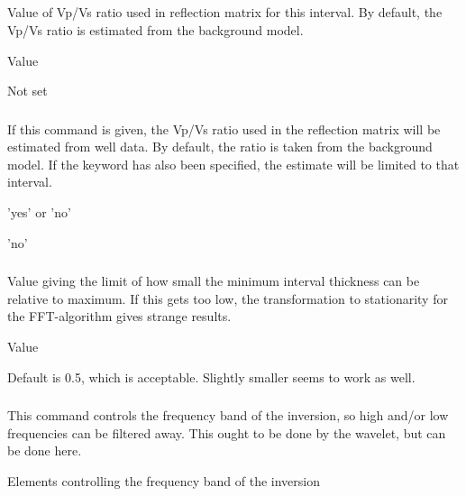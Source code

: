 \subparagraph{}
 \slist
   \item \Description Value of Vp/Vs ratio used in reflection
     matrix for this interval. By default, the Vp/Vs ratio is estimated from the
     background model.
   \item \Argument Value
   \item \Default Not set
   \elist
 
\subsubsection{}
 \slist
   \item \Description If this command is given, the Vp/Vs ratio used
     in the reflection matrix will be estimated from well data. By
     default, the ratio is taken from the background model. If the
     keyword  has also been specified,
     the estimate will be limited to that interval.
   \item \Argument 'yes' or 'no'
   \item \Default 'no'
   \elist

\subsubsection{}
 \slist
   \item \Description Value giving the limit of how small the minimum interval thickness can be relative to maximum. If this gets too low, the transformation to stationarity for the FFT-algorithm gives strange results.
   \item \Argument Value
   \item \Default Default is 0.5, which is acceptable. Slightly smaller seems to work as well.
 \elist

\subsubsection{}
 \slist
   \item \Description This command controls the frequency band of the inversion, so high and/or low frequencies can be filtered away. This ought to be done by the wavelet, but can be done here.
   \item \Argument Elements controlling the frequency band of the inversion
   \item \Default
 \elist

